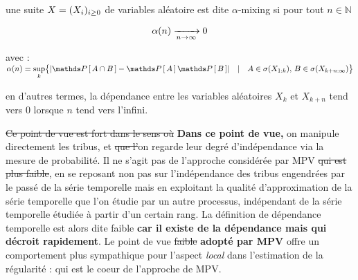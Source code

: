 \begin{definition*}

    une suite $X = ( {X}_{i})_{i \geq 0}$ de variables aléatoire est dite $\alpha$-mixing si pour tout $n \in \mathds N$


    $$
        \alpha(n) \xrightarrow[ n \rightarrow \infty ]{} 0
    $$

    avec : $\alpha(n) = \sup\limits_k \bigl\{ \lvert \proba{A \cap B} - \proba{A}\proba{B} \rvert \quad | \quad A \in \sigma( X_{1:k} ), \, B \in \sigma(X_{k+n : \infty}) \bigr\}$

    en d'autres termes, la \og dépendance \fg {} entre les variables aléatoires $X_k$ et $X_{k+n}$ tend vers 0 lorsque $n$ tend vers l'infini.
\end{definition*}

\textcolor{flatuicolors_rose}{\sout{{Ce point de vue est \og fort \fg dans le sens où}}} \textbf{Dans ce point de vue,} on manipule directement les tribus, et \sout{que l'}on regarde leur degré d'indépendance via la mesure de probabilité. Il ne s'agit pas de l'approche considérée par MPV \textcolor{flatuicolors_rose}{\sout{{qui est plus faible}}}, en se reposant non pas sur l'indépendance des tribus engendrées par le passé de la série temporelle mais en exploitant la qualité d'approximation de la série temporelle que l'on étudie par un autre processus, indépendant de la série temporelle étudiée à partir d'un certain rang. La définition de dépendance temporelle est alors dite \og faible \fg \textcolor{flatuicolors_blue_devil}{\textbf{car il existe de la dépendance mais qui décroit rapidement}}. Le point de vue \textcolor{flatuicolors_rose}{\sout{{faible}}} \textbf{adopté par MPV} offre un comportement plus sympathique pour l'aspect \emph{local} dans l'estimation de la régularité : qui est le coeur de l'approche de MPV.
